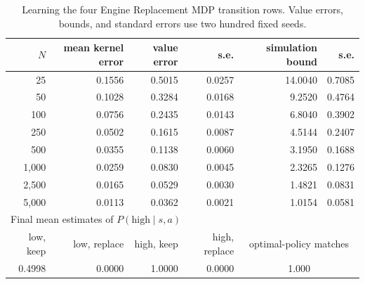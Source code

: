 \begin{table}[H]
\centering
\small
\caption{Learning the four Engine Replacement MDP transition rows. Value errors, bounds, and standard errors use two hundred fixed seeds.}
\label{tab:engine_model_learning}
\begin{tabular}{rrrrrr}
\hline
$N$ & mean kernel error & value error & s.e. & simulation bound & s.e. \\
\hline
25 & 0.1556 & 0.5015 & 0.0257 & 14.0040 & 0.7085 \\
50 & 0.1028 & 0.3284 & 0.0168 & 9.2520 & 0.4764 \\
100 & 0.0756 & 0.2435 & 0.0143 & 6.8040 & 0.3902 \\
250 & 0.0502 & 0.1615 & 0.0087 & 4.5144 & 0.2407 \\
500 & 0.0355 & 0.1138 & 0.0060 & 3.1950 & 0.1688 \\
1,000 & 0.0259 & 0.0830 & 0.0045 & 2.3265 & 0.1276 \\
2,500 & 0.0165 & 0.0529 & 0.0030 & 1.4821 & 0.0831 \\
5,000 & 0.0113 & 0.0362 & 0.0021 & 1.0154 & 0.0581 \\
\hline
\multicolumn{6}{l}{Final mean estimates of $P(\mathrm{high}\mid s,a)$} \\
\hline
low, keep & low, replace & high, keep & high, replace & \multicolumn{2}{c}{optimal-policy matches} \\
\hline
0.4998 & 0.0000 & 1.0000 & 0.0000 & \multicolumn{2}{c}{1.000} \\
\hline
\end{tabular}
\end{table}
